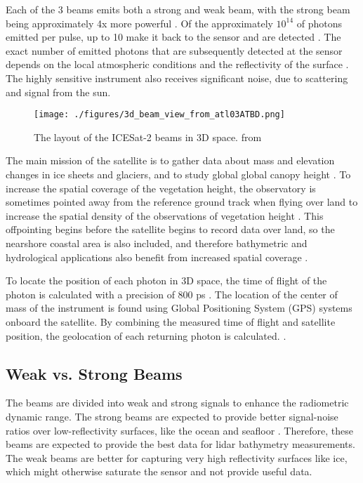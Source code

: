 Each of the 3 beams emits both a strong and weak beam, with the strong beam being approximately 4x more powerful \parencite{Neumann2019d}. Of the approximately \(10^{14}\) of photons emitted per pulse, up to  10 make it back to the sensor and are detected \parencite{Neumann2019d}. The exact number of emitted photons that are subsequently detected at the sensor depends on the local atmospheric conditions and the reflectivity of the surface \parencite{Neumann2019e}. The highly sensitive instrument also receives significant noise, due to scattering and signal from the sun.

\begin{figure}[htbp]
      \centering
      \texttt{[image: ./figures/3d\_beam\_view\_from\_atl03ATBD.png]}
      \caption{The layout of the ICESat-2 beams in 3D space. from \cite{Neumann2019d}}
      \label{3d-beams}
\end{figure}


The main mission of the satellite is to gather data about mass and elevation changes in ice sheets and glaciers, and to study global global canopy height \parencite{Markus2017}. To increase the spatial coverage of the vegetation height, the observatory is sometimes pointed away from the reference ground track when flying over land to increase the spatial density of the observations of vegetation height \parencite{Markus2017}. This offpointing begins before the satellite begins to record data over land, so the nearshore coastal area is also included, and therefore bathymetric and hydrological applications also benefit from increased spatial coverage \parencite{Magruder2021}.

To locate the position of each photon in 3D space, the time of flight of the photon is calculated with a precision of 800 ps \parencite{Neumann2019d}. The location of the center of mass of the instrument is found using Global Positioning System (GPS) systems onboard the satellite. By combining the measured time of flight and satellite position, the geolocation of each returning photon is calculated. \parencite{Neumann2019d}.

\subsection{Weak vs. Strong Beams}

The beams are divided into weak and strong signals to enhance the radiometric dynamic range. The strong beams are expected to provide better signal-noise ratios over low-reflectivity surfaces, like the ocean and seafloor \parencite{Neumann2019d}. Therefore, these beams are expected to provide the best data for lidar bathymetry measurements. The weak beams are better for capturing very high reflectivity surfaces like ice, which might otherwise saturate the sensor and not provide useful data.


